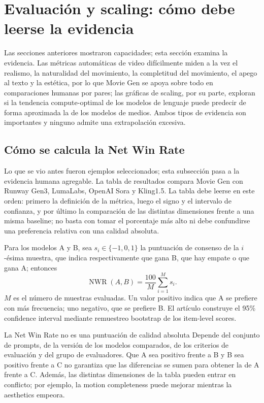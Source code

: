 \section{Evaluación y scaling: cómo debe leerse la evidencia}

Las secciones anteriores mostraron capacidades; esta sección examina la evidencia. Las métricas automáticas de video difícilmente miden a la vez el realismo, la naturalidad del movimiento, la completitud del movimiento, el apego al texto y la estética, por lo que Movie Gen se apoya sobre todo en comparaciones humanas por pares; las gráficas de scaling, por su parte, exploran si la tendencia compute-optimal de los modelos de lenguaje puede predecir de forma aproximada la de los modelos de medios. Ambos tipos de evidencia son importantes y ninguno admite una extrapolación excesiva.

\subsection{Cómo se calcula la Net Win Rate}

Lo que se vio antes fueron ejemplos seleccionados; esta subsección pasa a la evidencia humana agregable. La tabla de resultados compara Movie Gen con Runway Gen3, LumaLabs, OpenAI Sora y Kling1.5. La tabla debe leerse en este orden: primero la definición de la métrica, luego el signo y el intervalo de confianza, y por último la comparación de las distintas dimensiones frente a una misma baseline; no basta con tomar el porcentaje más alto ni debe confundirse una preferencia relativa con una calidad absoluta.


Para los modelos A y B, sea $s_i\in\{-1,0,1\}$ la puntuación de consenso de la $i$-ésima muestra, que indica respectivamente que gana B, que hay empate o que gana A; entonces
\[
\operatorname{NWR}(A,B)=\frac{100}{M}\sum_{i=1}^{M}s_i.
\]
$M$ es el número de muestras evaluadas. Un valor positivo indica que A se prefiere con más frecuencia; uno negativo, que se prefiere B. El artículo construye el 95\% confidence interval mediante remuestreo bootstrap de los item-level scores.

\begin{warningbox}{La Net Win Rate no es una puntuación de calidad absoluta}
Depende del conjunto de prompts, de la versión de los modelos comparados, de los criterios de evaluación y del grupo de evaluadores. Que A sea positivo frente a B y B sea positivo frente a C no garantiza que las diferencias se sumen para obtener la de A frente a C. Además, las distintas dimensiones de la tabla pueden entrar en conflicto; por ejemplo, la motion completeness puede mejorar mientras la aesthetics empeora.
\end{warningbox}

